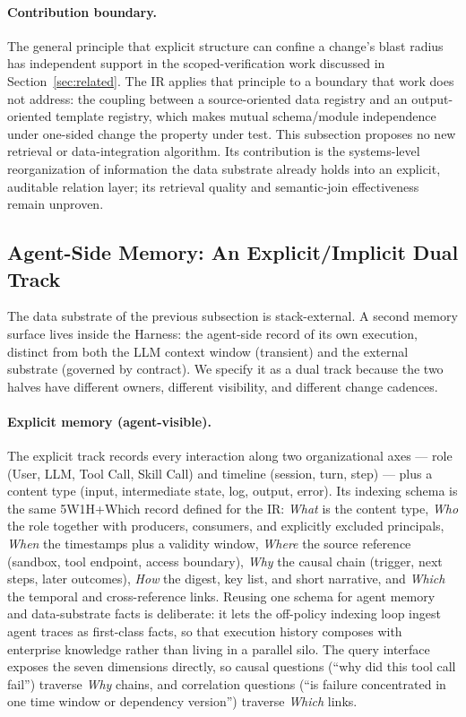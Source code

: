 \paragraph{Contribution boundary.}
The general principle that explicit structure can confine a change's blast radius has independent support in the scoped-verification work discussed in Section~\ref{sec:related}. The IR applies that principle to a boundary that work does not address: the coupling between a source-oriented data registry and an output-oriented template registry, which makes mutual schema/module independence under one-sided change the property under test. This subsection proposes no new retrieval or data-integration algorithm. Its contribution is the systems-level reorganization of information the data substrate already holds into an explicit, auditable relation layer; its retrieval quality and semantic-join effectiveness remain unproven.

\subsection{Agent-Side Memory: An Explicit/Implicit Dual Track}
\label{sec:memory-dualtrack}

The data substrate of the previous subsection is stack-external. A second memory surface lives inside the Harness: the agent-side record of its own execution, distinct from both the LLM context window (transient) and the external substrate (governed by contract). We specify it as a dual track because the two halves have different owners, different visibility, and different change cadences.

\paragraph{Explicit memory (agent-visible).}
The explicit track records every interaction along two organizational axes --- role (User, LLM, Tool Call, Skill Call) and timeline (session, turn, step) --- plus a content type (input, intermediate state, log, output, error). Its indexing schema is the same 5W1H+Which record defined for the IR: \textit{What} is the content type, \textit{Who} the role together with producers, consumers, and explicitly excluded principals, \textit{When} the timestamps plus a validity window, \textit{Where} the source reference (sandbox, tool endpoint, access boundary), \textit{Why} the causal chain (trigger, next steps, later outcomes), \textit{How} the digest, key list, and short narrative, and \textit{Which} the temporal and cross-reference links. Reusing one schema for agent memory and data-substrate facts is deliberate: it lets the off-policy indexing loop ingest agent traces as first-class facts, so that execution history composes with enterprise knowledge rather than living in a parallel silo. The query interface exposes the seven dimensions directly, so causal questions (``why did this tool call fail'') traverse \textit{Why} chains, and correlation questions (``is failure concentrated in one time window or dependency version'') traverse \textit{Which} links.

